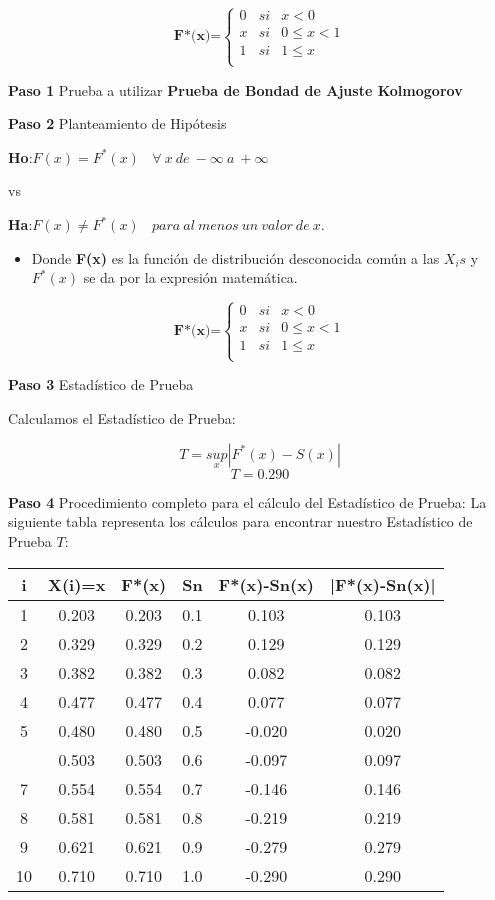 \documentclass[a4paper,oneside,openany]{book}
\providecommand{\tightlist}{%
  \setlength{\itemsep}{0pt}\setlength{\parskip}{0pt}}
\begin{document}
\[
\textbf{F*(x)=} \left\{
\begin{array}{lcc}
0 & si & x < 0 \\
x & si & 0 \leq x < 1 \\
1 & si & 1 \leq x \\
\end{array}
\right.
\]

\textbf{Paso 1} Prueba a utilizar \textbf{Prueba de Bondad de Ajuste
Kolmogorov}

\textbf{Paso 2} Planteamiento de Hipótesis

\textbf{Ho}:\(F(x)=F^*(x) \ \ \ \ \forall\ x\  de\ -\infty \ a\  +\infty\)

vs

\textbf{Ha}:\(F(x) \neq F^*(x) \ \ \ \ para\ al\ menos\ un\  valor\ de\  x.\)

\begin{itemize}
\tightlist
\item
  Donde \textbf{F(x)} es la función de distribución desconocida común a
  las \(X_{i}s\) y \(F^*(x)\) se da por la expresión matemática.
\end{itemize}

\[
\textbf{F*(x)=} \left\{
\begin{array}{lcc}
0 & si & x < 0 \\
x & si & 0 \leq x < 1 \\
1 & si & 1 \leq x \\
\end{array}
\right.
\]

\textbf{Paso 3} Estadístico de Prueba

Calculamos el Estadístico de Prueba:

\[T=\underset{x}{sup}|F^*(x)-S(x)|\] \[T=0.290\]

\textbf{Paso 4} Procedimiento completo para el cálculo del Estadístico
de Prueba: La siguiente tabla representa los cálculos para encontrar
nuestro Estadístico de Prueba \(T\):

\begin{table}[H]
\centering
\begin{tabular}{cccccc}
\toprule
i & X(i)=x & F*(x) & Sn & F*(x)-Sn(x) & |F*(x)-Sn(x)|\\
\midrule
1 & 0.203 & 0.203 & 0.1 & 0.103 & 0.103\\
2 & 0.329 & 0.329 & 0.2 & 0.129 & 0.129\\
3 & 0.382 & 0.382 & 0.3 & 0.082 & 0.082\\
4 & 0.477 & 0.477 & 0.4 & 0.077 & 0.077\\
5 & 0.480 & 0.480 & 0.5 & -0.020 & 0.020\\
\addlinespace
6 & 0.503 & 0.503 & 0.6 & -0.097 & 0.097\\
7 & 0.554 & 0.554 & 0.7 & -0.146 & 0.146\\
8 & 0.581 & 0.581 & 0.8 & -0.219 & 0.219\\
9 & 0.621 & 0.621 & 0.9 & -0.279 & 0.279\\
10 & 0.710 & 0.710 & 1.0 & -0.290 & 0.290\\
\bottomrule
\end{tabular}
\end{table}
\end{document}
